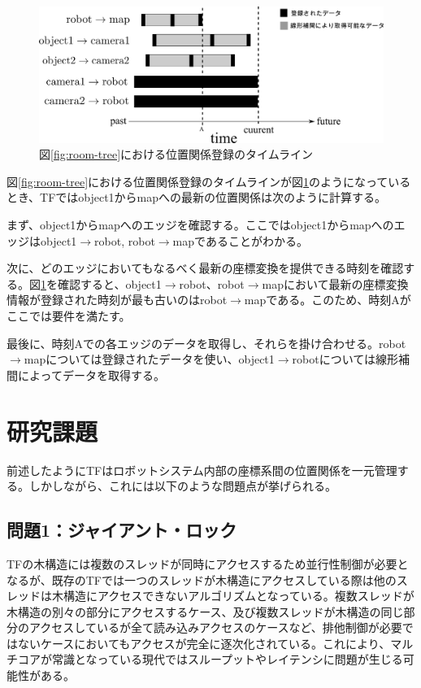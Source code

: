 \documentclass[a4paper]{jreport}	%
\begin{document}
\begin{figure}[h] 
\centering
\includegraphics[width=15cm]{room-timeline}	
\caption{図\ref{fig:room-tree}における位置関係登録のタイムライン}
\label{fig:room-timeline}
\end{figure}

図\ref{fig:room-tree}における位置関係登録のタイムラインが図\ref{fig:room-timeline}のようになっているとき、TFではobject1からmapへの最新の位置関係は次のように計算する。

まず、object1からmapへのエッジを確認する。ここではobject1からmapへのエッジはobject1$\rightarrow$robot, robot$\rightarrow$mapであることがわかる。

次に、どのエッジにおいてもなるべく最新の座標変換を提供できる時刻を確認する。図\ref{fig:room-timeline}を確認すると、object1$\rightarrow$robot、robot$\rightarrow$mapにおいて最新の座標変換情報が登録された時刻が最も古いのはrobot$\rightarrow$mapである。このため、時刻Aがここでは要件を満たす。

最後に、時刻Aでの各エッジのデータを取得し、それらを掛け合わせる。robot$\rightarrow$mapについては登録されたデータを使い、object1$\rightarrow$robotについては線形補間によってデータを取得する。

\section{研究課題}
前述したようにTFはロボットシステム内部の座標系間の位置関係を一元管理する。しかしながら、これには以下のような問題点が挙げられる。

\subsection*{問題1：ジャイアント・ロック}
TFの木構造には複数のスレッドが同時にアクセスするため並行性制御が必要となるが、既存のTFでは一つのスレッドが木構造にアクセスしている際は他のスレッドは木構造にアクセスできないアルゴリズムとなっている。複数スレッドが木構造の別々の部分にアクセスするケース、及び複数スレッドが木構造の同じ部分のアクセスしているが全て読み込みアクセスのケースなど、排他制御が必要ではないケースにおいてもアクセスが完全に逐次化されている。これにより、マルチコアが常識となっている現代ではスループットやレイテンシに問題が生じる可能性がある。
\end{document}
